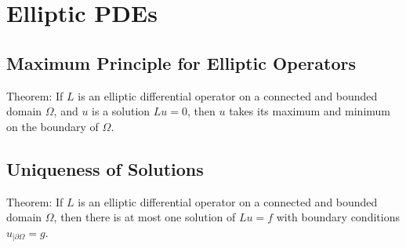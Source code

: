 \section{Elliptic PDEs}
\subsection{Maximum Principle for Elliptic Operators}
Theorem: If $L$ is an elliptic differential operator on a connected and bounded domain $\Omega$,
and $u$ is a solution $Lu = 0$, then $u$ takes its maximum and minimum on the boundary of $\Omega$.

\subsection{Uniqueness of Solutions}
Theorem: If $L$ is an elliptic differential operator on a connected and bounded domain $\Omega$,
then there is at most one solution of $Lu = f$ with boundary conditions $u_{|\partial\Omega} = g$.